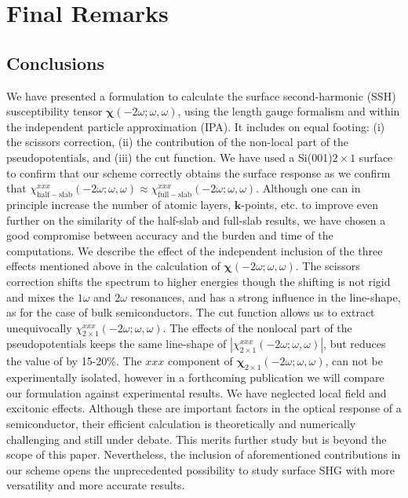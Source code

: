 \chapter{Final Remarks}\label{chap:conclusions}
\partialtoc


\section{Conclusions}


We have presented a formulation to calculate the surface second-harmonic (SSH)
susceptibility tensor $\boldsymbol{\chi}(-2\omega;\omega,\omega)$, using the
length gauge formalism and within the independent particle approximation (IPA).
It includes on equal footing: (i) the scissors correction, (ii) the contribution
of the non-local part of the pseudopotentials, and (iii) the cut function. We
have used a Si(001)$2\times 1$ surface to confirm that our scheme correctly
obtains the surface response as we confirm that
$\chi_{\mathrm{half-slab}}^{xxx}(-2\omega;\omega,\omega) \approx
\chi_{\mathrm{full-slab}}^{xxx}(-2\omega;\omega,\omega) . $ Although one can in
principle increase the number of atomic layers, $\mathbf{k}$-points, etc. to
improve even further on the similarity of the half-slab and full-slab results,
we have chosen a good compromise between accuracy and the burden and time of the
computations. We describe the effect of the independent inclusion of the three
effects mentioned above in the calculation of
$\boldsymbol{\chi}(-2\omega;\omega,\omega)$. The scissors correction shifts the
spectrum to higher energies though the shifting is not rigid and mixes the
$1\omega$ and $2\omega$ resonances, and has a strong influence in the
line-shape, as for the case of bulk
semiconductors.\cite{luppiJCP10,luppiPRB10,leitsmannPRB05} The cut function
allows us to extract unequivocally $\chi^{xxx}_{2\times
1}(-2\omega;\omega,\omega)$. The effects of the nonlocal part of the
pseudopotentials keeps the same line-shape of $|\chi^{xxx}_{2\times
1}(-2\omega;\omega,\omega)|$, but reduces the value of by 15-20\%. The $xxx$
component of $\boldsymbol{\chi}_{2\times 1}(-2\omega;\omega,\omega)$, can not be
experimentally isolated, however in a forthcoming publication we will compare
our formulation against experimental results. We have neglected local field and
excitonic effects. Although these are important factors in the optical response
of a semiconductor, their efficient calculation is theoretically and numerically
challenging and still under debate.\cite{beyond} This merits further study but
is beyond the scope of this paper. Nevertheless, the inclusion of aforementioned
contributions in our scheme opens the unprecedented possibility to study surface
SHG with more versatility and more accurate results.


